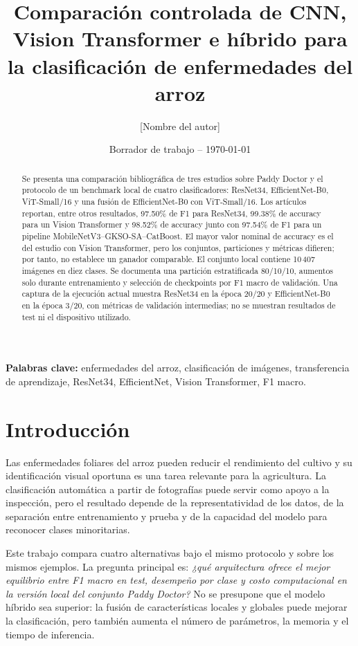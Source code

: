 \documentclass[11pt,a4paper]{article}
\title{Comparación controlada de CNN, Vision Transformer e híbrido para la clasificación de enfermedades del arroz}
\author{[Nombre del autor]}
\date{Borrador de trabajo -- \today}
\begin{document}
\maketitle

\begin{abstract}
Se presenta una comparación bibliográfica de tres estudios sobre Paddy Doctor y el protocolo de un benchmark local de cuatro clasificadores: ResNet34, EfficientNet-B0, ViT-Small/16 y una fusión de EfficientNet-B0 con ViT-Small/16. Los artículos reportan, entre otros resultados, 97.50\% de F1 para ResNet34, 99.38\% de accuracy para un Vision Transformer y 98.52\% de accuracy junto con 97.54\% de F1 para un pipeline MobileNetV3--GKSO-SA--CatBoost. El mayor valor nominal de accuracy es el del estudio con Vision Transformer, pero los conjuntos, particiones y métricas difieren; por tanto, no establece un ganador comparable. El conjunto local contiene 10\,407 imágenes en diez clases. Se documenta una partición estratificada 80/10/10, aumentos solo durante entrenamiento y selección de checkpoints por F1 macro de validación. Una captura de la ejecución actual muestra ResNet34 en la época 20/20 y EfficientNet-B0 en la época 3/20, con métricas de validación intermedias; no se muestran resultados de test ni el dispositivo utilizado.
\end{abstract}

\noindent\textbf{Palabras clave:} enfermedades del arroz, clasificación de imágenes, transferencia de aprendizaje, ResNet34, EfficientNet, Vision Transformer, F1 macro.

\section{Introducción}
Las enfermedades foliares del arroz pueden reducir el rendimiento del cultivo y su identificación visual oportuna es una tarea relevante para la agricultura. La clasificación automática a partir de fotografías puede servir como apoyo a la inspección, pero el resultado depende de la representatividad de los datos, de la separación entre entrenamiento y prueba y de la capacidad del modelo para reconocer clases minoritarias.

Este trabajo compara cuatro alternativas bajo el mismo protocolo y sobre los mismos ejemplos. La pregunta principal es: \emph{¿qué arquitectura ofrece el mejor equilibrio entre F1 macro en test, desempeño por clase y costo computacional en la versión local del conjunto Paddy Doctor?} No se presupone que el modelo híbrido sea superior: la fusión de características locales y globales puede mejorar la clasificación, pero también aumenta el número de parámetros, la memoria y el tiempo de inferencia.
\end{document}
